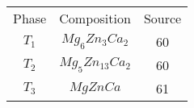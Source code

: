 \begin{tabular}{ c c c }
  Phase & Composition & Source \\
  $T_{1}$ & $Mg_{6} Zn_{3} Ca_{2}$ & 60 \\
  $T_{2}$ & $Mg_{5} Zn_{13} Ca_{2}$ & 60 \\
  $T_{3}$ & $Mg Zn Ca$ & 61 \\
\end{tabular}
    
    